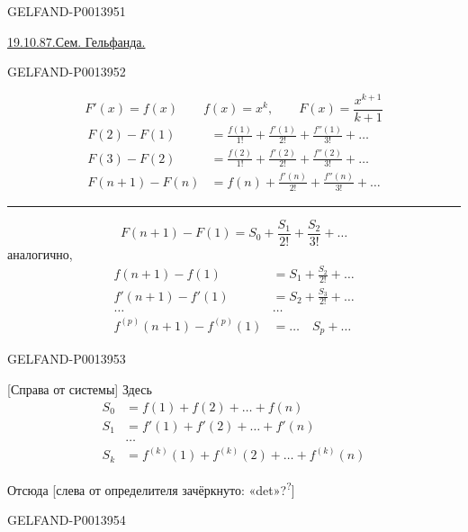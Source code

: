 \begin{GelfandAdjacentEvidence}{GELFAND-P001395}{1}

\uline{19.10.87.}\quad \uline{Сем. Гельфанда.}

\quad {}

\end{GelfandAdjacentEvidence}
\begin{GelfandAdjacentEvidence}{GELFAND-P001395}{2}


\[
F'(x)=f(x)\qquad f(x)=x^k,\qquad F(x)=\frac{x^{k+1}}{k+1}
\]
\begin{align*}
F(2)-F(1)&=\frac{f(1)}{1!}+\frac{f'(1)}{2!}+\frac{f''(1)}{3!}+\ldots\\
F(3)-F(2)&=\frac{f(2)}{1!}+\frac{f'(2)}{2!}+\frac{f''(2)}{3!}+\ldots\\[8pt]
F(n+1)-F(n)&=f(n)+\frac{f'(n)}{2!}+\frac{f''(n)}{3!}+\ldots
\end{align*}
\rule{9cm}{.3pt}
\[
F(n+1)-F(1)=S_0+\frac{S_1}{2!}+\frac{S_2}{3!}+\ldots
\]
аналогично,
\begin{align*}
f(n+1)-f(1)&=S_1+\frac{S_2}{2!}+\ldots\\
f'(n+1)-f'(1)&=S_2+\frac{S_3}{2!}+\ldots\\
\ldots\qquad&\ldots\\
f^{(p)}(n+1)-f^{(p)}(1)&=\ldots\quad S_p+\ldots
\end{align*}
\end{GelfandAdjacentEvidence}
\begin{GelfandAdjacentEvidence}{GELFAND-P001395}{3}


[Справа от системы] Здесь
\begin{align*}
S_0&=f(1)+f(2)+\ldots+f(n)\\
S_1&=f'(1)+f'(2)+\ldots+f'(n)\\
&\ldots\\
S_k&=f^{(k)}(1)+f^{(k)}(2)+\ldots+f^{(k)}(n)
\end{align*}

Отсюда
[слева от определителя зачёркнуто:
«det»?\textsuperscript{?}]
\end{GelfandAdjacentEvidence}
\begin{GelfandAdjacentEvidence}{GELFAND-P001395}{4}

\end{GelfandAdjacentEvidence}
